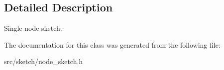 \subsection{Detailed Description}
Single node sketch. 

The documentation for this class was generated from the following file\+:\begin{DoxyCompactItemize}
\item 
src/sketch/node\+\_\+sketch.\+h\end{DoxyCompactItemize}
